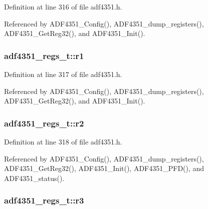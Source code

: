 Definition at line 316 of file adf4351.\+h.



Referenced by A\+D\+F4351\+\_\+\+Config(), A\+D\+F4351\+\_\+dump\+\_\+registers(), A\+D\+F4351\+\_\+\+Get\+Reg32(), and A\+D\+F4351\+\_\+\+Init().

\subsubsection[{\texorpdfstring{r1}{r1}}]{ adf4351\+\_\+regs\+\_\+t\+::r1}\hypertarget{structadf4351__regs__t_a9e35aa252797cdae6d46ae0daad2bc40}{}\label{structadf4351__regs__t_a9e35aa252797cdae6d46ae0daad2bc40}


Definition at line 317 of file adf4351.\+h.



Referenced by A\+D\+F4351\+\_\+\+Config(), A\+D\+F4351\+\_\+dump\+\_\+registers(), A\+D\+F4351\+\_\+\+Get\+Reg32(), and A\+D\+F4351\+\_\+\+Init().

\subsubsection[{\texorpdfstring{r2}{r2}}]{ adf4351\+\_\+regs\+\_\+t\+::r2}\hypertarget{structadf4351__regs__t_af6667dbbd7434e0394cc9f569d3e24bb}{}\label{structadf4351__regs__t_af6667dbbd7434e0394cc9f569d3e24bb}


Definition at line 318 of file adf4351.\+h.



Referenced by A\+D\+F4351\+\_\+\+Config(), A\+D\+F4351\+\_\+dump\+\_\+registers(), A\+D\+F4351\+\_\+\+Get\+Reg32(), A\+D\+F4351\+\_\+\+Init(), A\+D\+F4351\+\_\+\+P\+F\+D(), and A\+D\+F4351\+\_\+status().

\subsubsection[{\texorpdfstring{r3}{r3}}]{ adf4351\+\_\+regs\+\_\+t\+::r3}\hypertarget{structadf4351__regs__t_a1aa968491b1182f3ae4f426ef5c1b83a}{}\label{structadf4351__regs__t_a1aa968491b1182f3ae4f426ef5c1b83a}


